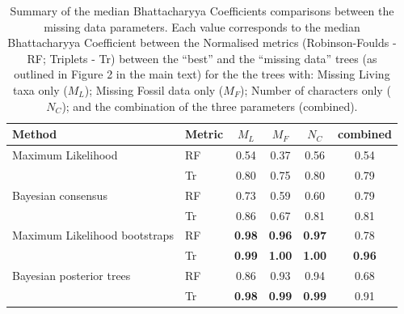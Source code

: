 \documentclass[12pt,letterpaper]{article}
\begin{document}
\begin{table}[ht]
\caption{Summary of the median Bhattacharyya Coefficients comparisons between the missing data parameters. Each value corresponds to the median Bhattacharyya Coefficient between the Normalised metrics (Robinson-Foulds - RF; Triplets - Tr) between the ``best'' and the ``missing data'' trees (as outlined in Figure 2 in the main text) for the the trees with: Missing Living taxa only ($M_L$); Missing Fossil data only ($M_F$); Number of characters only ($N_C$); and the combination of the three parameters (combined).} 
\begin{tabular}{llcccc}  
  \hline
 Method & Metric & $M_L$ & $M_F$ & $N_C$ & combined \\ 
  \hline
Maximum Likelihood & RF & 0.54 & 0.37 & 0.56 & 0.54 \\ 
                   & Tr & 0.80 & 0.75 & 0.80 & 0.79 \\ 
Bayesian consensus & RF & 0.73 & 0.59 & 0.60 & 0.79 \\ 
                   & Tr & 0.86 & 0.67 & 0.81 & 0.81 \\ 
Maximum Likelihood bootstraps & RF & \textbf{0.98} & \textbf{0.96} & \textbf{0.97} & 0.78 \\ 
                   & Tr & \textbf{0.99} & \textbf{1.00} & \textbf{1.00} & \textbf{0.96} \\ 
Bayesian posterior trees & RF & 0.86 & 0.93 & 0.94 & 0.68 \\ 
                   & Tr & \textbf{0.98} & \textbf{0.99} & \textbf{0.99} & 0.91 \\ 
 \hline
\end{tabular}
\end{table}
\end{document}
